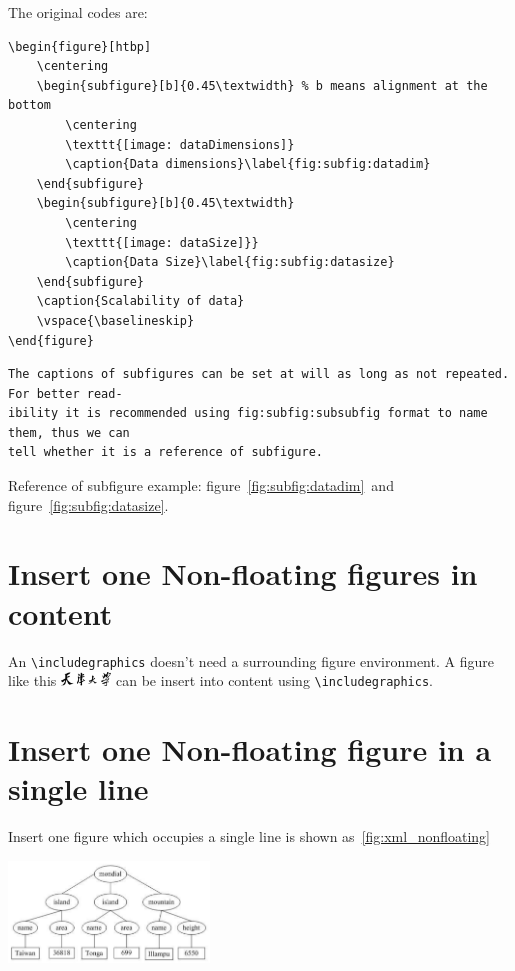 The original codes are:

\begin{lstlisting}[language={[LaTeX]TeX}]
\begin{figure}[htbp]
	\centering
	\begin{subfigure}[b]{0.45\textwidth} % b means alignment at the bottom
		\centering
		\texttt{[image: dataDimensions]}
		\caption{Data dimensions}\label{fig:subfig:datadim}
	\end{subfigure}
	\begin{subfigure}[b]{0.45\textwidth}
		\centering
		\texttt{[image: dataSize]}}
		\caption{Data Size}\label{fig:subfig:datasize}
	\end{subfigure}
	\caption{Scalability of data}
	\vspace{\baselineskip}
\end{figure}
\end{lstlisting}

\begin{lstlisting}[language={[LaTeX]TeX}]
The captions of subfigures can be set at will as long as not repeated. For better read-
ibility it is recommended using fig:subfig:subsubfig format to name them, thus we can 
tell whether it is a reference of subfigure.
\end{lstlisting}

Reference of subfigure example: figure~\ref{fig:subfig:datadim}~and figure~\ref{fig:subfig:datasize}.

\section{Insert one Non-floating figures in content}
An \verb|\includegraphics| doesn't need a surrounding figure environment. A figure like this \includegraphics[width=0.1\textwidth]{figures/tju.pdf} can be insert into content using \verb|\includegraphics|.

\section{Insert one Non-floating figure in a single line}
Insert one figure which occupies a single line is shown as~\ref{fig:xml_nonfloating}
\begin{center}
	\includegraphics[width=0.4\textwidth]{figures/XML.pdf}
	\label{fig:xml_nonfloating}
	\vspace{\baselineskip}
\end{center}

